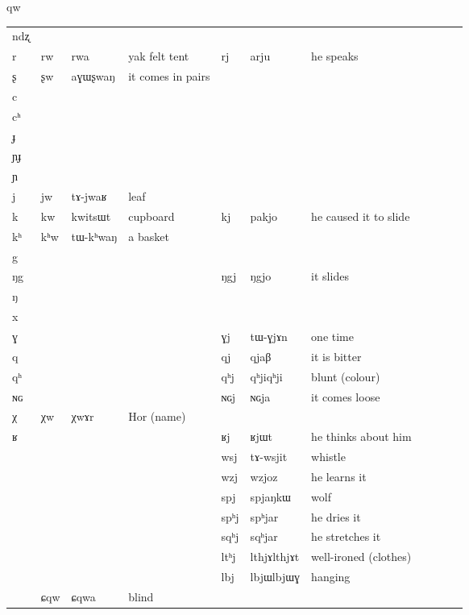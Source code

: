 qw\documentclass[oldfontcommands,oneside,a4paper,11pt]{article}
\newcommand{\ipa}[1]{{\phon #1}} %
\newcommand{\tib}[1]{\cellcolor{lightgray}\textbf{#1}}
\newcommand{\idph}[1]{\cellcolor{gray}\textbf{#1}}
\begin{document}
\begin{table}
{\begin{tabular}{l|lll|lll|lll|l}
\ipa{ndʐ} &	 &	 &	&	 &	 &	\\
\ipa{r} &	\ipa{rw}\tib{} &	\ipa{rwa} &	yak felt tent&	\ipa{rj} &	\ipa{arju} &he speaks	\\
\ipa{ʂ} &	\ipa{ʂw} \tib{}&	\ipa{aɣɯʂwaŋ} &	it comes in pairs&	 &	 &	\\
\ipa{c} &	 &	 &	&	 &	 &	\\
\ipa{cʰ} &	 &	 &	&	 &	 &	\\
\ipa{ɟ} &	 &	 &	&	 &	 &	\\
\ipa{ɲɟ} &	 &	 &	&	 &	 &	\\
\ipa{ɲ} &	 &	 &	&	 &	 &	\\
\ipa{j} &	\ipa{jw} &	\ipa{tɤ-jwaʁ} &leaf	&	 &	 &	\\
\ipa{k} &	\ipa{kw}\tib{} &	\ipa{kwitsɯt} &	cupboard&	\ipa{kj} &	\ipa{pakjo} &he caused it to slide	\\
\ipa{kʰ} &	\ipa{kʰw}\tib{} &	\ipa{tɯ-kʰwaŋ} &a basket	&	 &	 &	\\
\ipa{g} &	 &	 &	&	 &	 &	\\
\ipa{ŋg} &	 &	 &	&	\ipa{ŋgj} &	\ipa{ŋgjo} &it  slides	\\
\ipa{ŋ} &	 &	 &	&	 &	 &	\\
\ipa{x} &	 &	 &	&	 &	 &	\\
\ipa{ɣ} &	 &	 &	&	\ipa{ɣj} &	\ipa{tɯ-ɣjɤn} &	one time\\
\ipa{q} &	 &	 &	&	\ipa{qj} &	\ipa{qjaβ} &it is bitter	\\
\ipa{qʰ} &	 &	 &	&	\ipa{qʰj} \idph{}&	\ipa{qʰjiqʰji} &blunt (colour)	\\
\ipa{ɴɢ} &	 &	 &	&	\ipa{ɴɢj} &	\ipa{ɴɢja} &it comes loose	\\
\ipa{χ} &	\ipa{χw}\tib{} &	\ipa{χwɤr} &Hor (name)	&	 &	 &	\\
\ipa{ʁ} &	 &	 &	&	\ipa{ʁj} &	\ipa{ʁjɯt} &he 	thinks about him\\
\midrule
 &	 &	&&\ipa{wsj} &	\ipa{tɤ-wsjit} &whistle	\\
 &	 &	&&	\ipa{wzj}  \tib{}&	\ipa{wzjoz}  &he learns it	\\
\midrule
 &	 &	&&\ipa{spj} &	\ipa{spjaŋkɯ} &wolf	\\
 &	 &	&&\ipa{spʰj} &	\ipa{spʰjar} & he dries it	\\
 &	 &	&&\ipa{sqʰj} &	\ipa{sqʰjar} & he stretches it	\\
\midrule
 &	 &	&&\ipa{ltʰj}  \idph{}&	\ipa{lthjɤlthjɤt} &	well-ironed (clothes)\\
 &	 &	&&\ipa{lbj} \idph{}&	\ipa{lbjɯlbjɯɣ} &	hanging\\
\midrule
&\ipa{ɕqw}&\ipa{ɕqwa} &blind\\

\end{tabular}}
\end{table}
\end{document}

